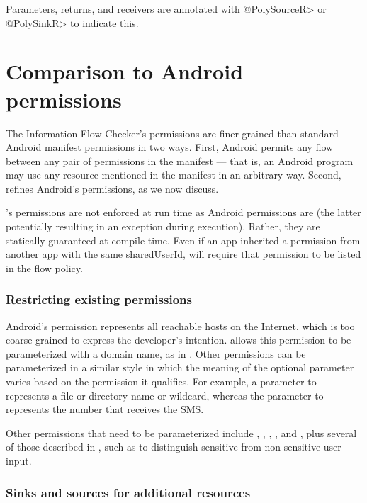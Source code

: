  Parameters, returns, and receivers are annotated with \<@PolySourceR> or \<@PolySinkR> to indicate this.
 
\section{Comparison to Android permissions\label{sec:permissions}}

The Information Flow Checker's permissions are finer-grained than standard Android manifest permissions
in two ways.  First, Android permits any flow
between any pair of permissions in the manifest --- that is, an Android
program may use any resource
mentioned in the manifest in an arbitrary way.  Second,
\theFlowChecker refines Android's permissions, as
we now discuss.

\TheFlowChecker's permissions are not enforced at run time as Android
permissions are (the latter potentially resulting in an exception during execution).
Rather, they are statically guaranteed at compile time.  Even if an app
inherited a permission from another app with the same sharedUserId, 
\theFlowChecker will require that permission to be listed in the flow policy.   

\subsubsection{Restricting existing permissions\label{sec:parameterized-permissions}}

Android's  permission represents all reachable 
hosts on the Internet, which is too coarse-grained to express the
developer's intention.  \TheFlowChecker allows this permission to be parameterized with a domain name,
as in .
Other permissions can be parameterized in a similar style in which 
the meaning of the optional parameter varies based on the permission 
it qualifies.
For example, a parameter to  represents a file or
directory name or wildcard, whereas the 
parameter to  represents the number that receives the
SMS\@.

Other permissions that need to be parameterized include 
, ,
, , and , plus several of those
described in , such as  to
distinguish sensitive from non-sensitive user input.


\subsubsection{Sinks and sources for additional resources}
\label{sec:new-permissions}

